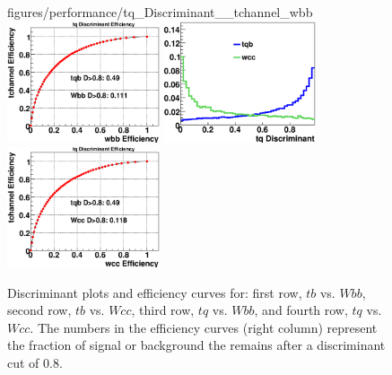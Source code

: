 \begin{figure}[!h!tbp]
{figures/performance/tq_Discriminant__tchannel_wbb}
\includegraphics[width=0.40\textwidth]
{figures/performance/tq_Efficiency__tchannel_wbb}
\includegraphics[width=0.40\textwidth]
{figures/performance/tq_Discriminant__tchannel_wcc}
\includegraphics[width=0.40\textwidth]
{figures/performance/tq_Efficiency__tchannel_wcc}
\caption[discwbb]{Discriminant plots and efficiency curves for:
first row, $tb$ vs. $Wbb$, second row, $tb$ vs. $Wcc$, third row, $tq$
vs. $Wbb$, and fourth row, $tq$ vs. $Wcc$. The numbers in the
efficiency curves (right column) represent the fraction of signal or
background the remains after a discriminant cut of 0.8.}
\label{disc_wbb}
\end{figure}

